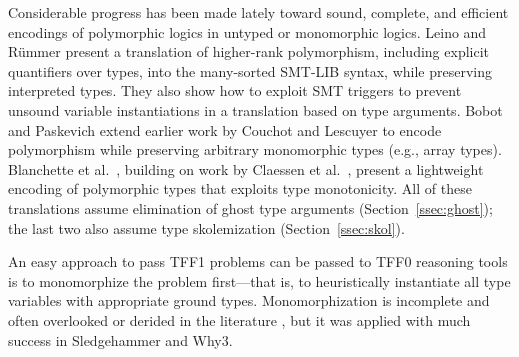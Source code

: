 Considerable progress has been made lately toward sound, complete, and efficient
encodings of polymorphic logics in untyped or monomorphic logics. Leino and
R\"ummer \cite{leino-ruemmer-2010} present a translation of higher-rank
polymorphism, including explicit quantifiers over types, into the many-sorted
SMT-LIB syntax, while preserving interpreted types. They also show how to
exploit SMT triggers to prevent unsound variable instantiations in a
translation based on type arguments. Bobot and Paskevich
\cite{bobot-paskevich-2011} extend earlier work by Couchot and Lescuyer
\cite{couchot-lescuyer-2007} to encode polymorphism while preserving
arbitrary monomorphic types (e.g., array types).
Blanchette et
al.\ \cite{blanchette-et-al-2012-mono}, building on work by Claessen et al.\
\cite{claessen-et-al-2011}, present a %
lightweight encoding of
polymorphic types that exploits type monotonicity. All of these translations
assume %
elimination of ghost type arguments
(Section~\ref{ssec:ghost}); the last two also assume type skolemization
(Section~\ref{ssec:skol}).

An easy approach to pass TFF1 problems can be passed to TFF0
reasoning tools is to monomorphize the problem first---that is, to heuristically
instantiate all type variables with appropriate
ground types. Monomorphization is incomplete and often overlooked
or derided in the literature \cite[p.\ 3]{couchot-lescuyer-2007}, but it was
applied with much success in Sledgehammer \cite[\S6]{blanchette-et-al-2012-mono}
and Why3.
